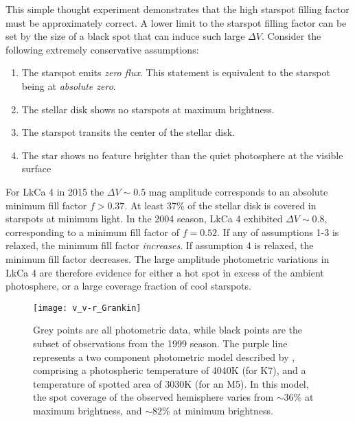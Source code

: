 \documentclass[twocolumn]{emulateapj}%
\begin{document}
This simple thought experiment demonstrates that the high starspot filling factor must be approximately correct.  A lower limit to the starspot filling factor can be set by the size of a black spot that can induce such large $\Delta V$.  Consider the following extremely conservative assumptions:  \begin{enumerate}
  \item The starspot emits \emph{zero flux}.  This statement is equivalent to the starspot being at \emph{absolute zero}.
  \item The stellar disk shows no starspots at maximum brightness.
  \item The starspot transits the center of the stellar disk.
  \item The star shows no feature brighter than the quiet photosphere at the visible surface
\end{enumerate}

For LkCa 4 in 2015 the $\Delta V\sim 0.5$ mag amplitude corresponds to an absolute minimum fill factor $f>0.37$.  At least 37\% of the stellar disk is covered in starspots at minimum light.  In the 2004 season, LkCa 4 exhibited $\Delta V\sim 0.8$, corresponding to a minimum fill factor of $f=0.52$.  If any of assumptions 1-3 is relaxed, the minimum fill factor \emph{increases}.  If assumption 4 is relaxed, the minimum fill factor decreases.  The large amplitude photometric variations in LkCa 4 are therefore evidence for either a hot spot in excess of the ambient photosphere, or a large coverage fraction of cool starspots.  


\begin{figure}
 \centering
\texttt{[image: v\_v-r\_Grankin]} 
\caption{Grey points are all \citet{grankin08} photometric data, while black points are the subset of observations from the 1999 season.  The purple line represents a two component photometric model  described by \citet{grankin08}, comprising a photospheric temperature of 4040K (for K7), and a temperature of spotted area of 3030K (for an M5). In this model, the spot coverage of the observed hemisphere varies from $\sim36\%$ at maximum brightness, and $\sim82\%$ at minimum brightness.}
 \label{fig:grankin_vr}
\end{figure}
\end{document}
